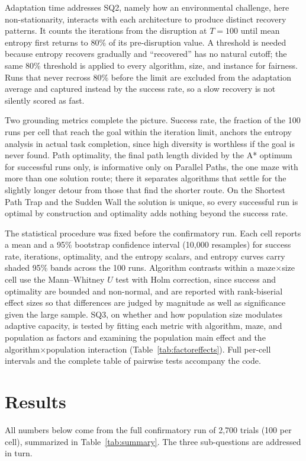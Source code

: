 \documentclass[11pt,a4paper]{article}
\begin{document}
    Adaptation time addresses SQ2, namely how an environmental challenge, here non-stationarity, interacts with each architecture to produce distinct recovery patterns. It counts the iterations from the disruption at $T=100$ until mean entropy first returns to 80\% of its pre-disruption value. A threshold is needed because entropy recovers gradually and ``recovered'' has no natural cutoff; the same 80\% threshold is applied to every algorithm, size, and instance for fairness. Runs that never recross 80\% before the limit are excluded from the adaptation average and captured instead by the success rate, so a slow recovery is not silently scored as fast.

    Two grounding metrics complete the picture. Success rate, the fraction of the 100 runs per cell that reach the goal within the iteration limit, anchors the entropy analysis in actual task completion, since high diversity is worthless if the goal is never found. Path optimality, the final path length divided by the A* optimum for successful runs only, is informative only on Parallel Paths, the one maze with more than one solution route; there it separates algorithms that settle for the slightly longer detour from those that find the shorter route. On the Shortest Path Trap and the Sudden Wall the solution is unique, so every successful run is optimal by construction and optimality adds nothing beyond the success rate.

    The statistical procedure was fixed before the confirmatory run. Each cell reports a mean and a 95\% bootstrap confidence interval (10{,}000 resamples) for success rate, iterations, optimality, and the entropy scalars, and entropy curves carry shaded 95\% bands across the 100 runs. Algorithm contrasts within a maze$\times$size cell use the Mann--Whitney $U$ test with Holm correction, since success and optimality are bounded and non-normal, and are reported with rank-biserial effect sizes so that differences are judged by magnitude as well as significance given the large sample. SQ3, on whether and how population size modulates adaptive capacity, is tested by fitting each metric with algorithm, maze, and population as factors and examining the population main effect and the algorithm$\times$population interaction (Table~\ref{tab:factoreffects}). Full per-cell intervals and the complete table of pairwise tests accompany the code.

    \section{Results}
    All numbers below come from the full confirmatory run of 2{,}700 trials (100 per cell), summarized in Table~\ref{tab:summary}. The three sub-questions are addressed in turn.
\end{document}
